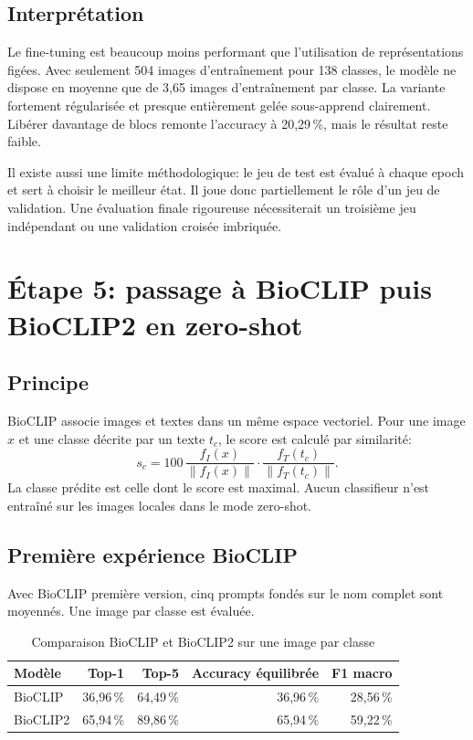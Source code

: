 \documentclass[11pt,a4paper]{report}
\newcommand{\pct}[1]{#1\,\%}
\begin{document}
\section{Interprétation}

Le fine-tuning est beaucoup moins performant que l'utilisation de représentations
figées. Avec seulement 504 images d'entraînement pour 138 classes, le modèle ne
dispose en moyenne que de 3,65 images d'entraînement par classe. La variante
fortement régularisée et presque entièrement gelée sous-apprend clairement.
Libérer davantage de blocs remonte l'accuracy à \pct{20,29}, mais le résultat reste
faible.

Il existe aussi une limite méthodologique: le jeu de test est évalué à chaque
epoch et sert à choisir le meilleur état. Il joue donc partiellement le rôle d'un
jeu de validation. Une évaluation finale rigoureuse nécessiterait un troisième
jeu indépendant ou une validation croisée imbriquée.

\chapter{Étape 5: passage à BioCLIP puis BioCLIP2 en zero-shot}

\section{Principe}

BioCLIP associe images et textes dans un même espace vectoriel. Pour une image
$x$ et une classe décrite par un texte $t_c$, le score est calculé par similarité:
\[
s_c = 100\,\frac{f_I(x)}{\lVert f_I(x)\rVert}
\cdot
\frac{f_T(t_c)}{\lVert f_T(t_c)\rVert}.
\]
La classe prédite est celle dont le score est maximal. Aucun classifieur n'est
entraîné sur les images locales dans le mode zero-shot.

\section{Première expérience BioCLIP}

Avec BioCLIP première version, cinq prompts fondés sur le nom complet sont moyennés.
Une image par classe est évaluée.

\begin{table}[ht]
\centering
\caption{Comparaison BioCLIP et BioCLIP2 sur une image par classe}
\begin{tabular}{lrrrr}
\toprule
Modèle & Top-1 & Top-5 & Accuracy équilibrée & F1 macro \\
\midrule
BioCLIP & \pct{36,96} & \pct{64,49} & \pct{36,96} & \pct{28,56} \\
BioCLIP2 & \pct{65,94} & \pct{89,86} & \pct{65,94} & \pct{59,22} \\
\bottomrule
\end{tabular}
\end{table}
\end{document}
